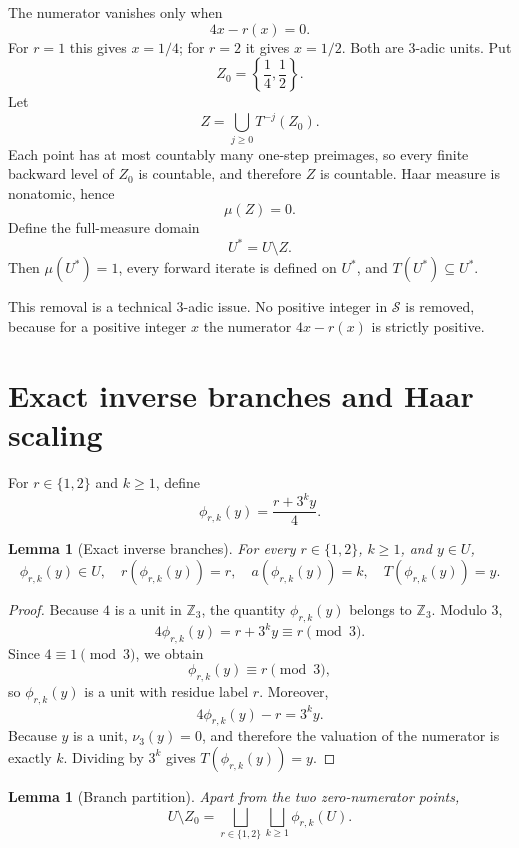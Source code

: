 \documentclass[11pt]{article}
\newtheorem{lemma}[theorem]{Lemma}
\theoremstyle{definition}
\theoremstyle{remark}
\newcommand{\vthree}{\nu_3}
\newcommand{\Sset}{\mathcal S}
\newcommand{\Ustar}{U^\ast}
\newcommand{\Zthree}{\mathbb Z_3}
\begin{document}
The numerator vanishes only when
\[
4x-r(x)=0.
\]
For $r=1$ this gives $x=1/4$; for $r=2$ it gives $x=1/2$.  Both are $3$-adic units.  Put
\[
Z_0=\left\{\frac14,\frac12\right\}.
\]
Let
\begin{equation}
Z=\bigcup_{j\ge0}T^{-j}(Z_0).
\label{eq:Z}
\end{equation}
Each point has at most countably many one-step preimages, so every finite backward level of $Z_0$ is countable, and therefore $Z$ is countable.  Haar measure is nonatomic, hence
\[
\mu(Z)=0.
\]
Define the full-measure domain
\begin{equation}
\Ustar=U\setminus Z.
\label{eq:Ustar}
\end{equation}
Then $\mu(\Ustar)=1$, every forward iterate is defined on $\Ustar$, and $T(\Ustar)\subseteq\Ustar$.

This removal is a technical $3$-adic issue.  No positive integer in $\Sset$ is removed, because for a positive integer $x$ the numerator $4x-r(x)$ is strictly positive.

\section{Exact inverse branches and Haar scaling}

For $r\in\{1,2\}$ and $k\ge1$, define
\begin{equation}
\phi_{r,k}(y)=\frac{r+3^ky}{4}.
\label{eq:phi}
\end{equation}

\begin{lemma}[Exact inverse branches]
For every $r\in\{1,2\}$, $k\ge1$, and $y\in U$,
\[
\phi_{r,k}(y)\in U,
\quad
r(\phi_{r,k}(y))=r,
\quad
a(\phi_{r,k}(y))=k,
\quad
T(\phi_{r,k}(y))=y.
\]
\end{lemma}

\begin{proof}
Because $4$ is a unit in $\Zthree$, the quantity $\phi_{r,k}(y)$ belongs to $\Zthree$.  Modulo $3$,
\[
4\phi_{r,k}(y)=r+3^ky\equiv r\pmod3.
\]
Since $4\equiv1\pmod3$, we obtain
\[
\phi_{r,k}(y)\equiv r\pmod3,
\]
so $\phi_{r,k}(y)$ is a unit with residue label $r$.  Moreover,
\[
4\phi_{r,k}(y)-r=3^ky.
\]
Because $y$ is a unit, $\vthree(y)=0$, and therefore the valuation of the numerator is exactly $k$.  Dividing by $3^k$ gives $T(\phi_{r,k}(y))=y$.
\end{proof}

\begin{lemma}[Branch partition]
Apart from the two zero-numerator points,
\begin{equation}
U\setminus Z_0
=
\bigsqcup_{r\in\{1,2\}}
\bigsqcup_{k\ge1}
\phi_{r,k}(U).
\label{eq:branch-partition}
\end{equation}
\end{lemma}
\end{document}
